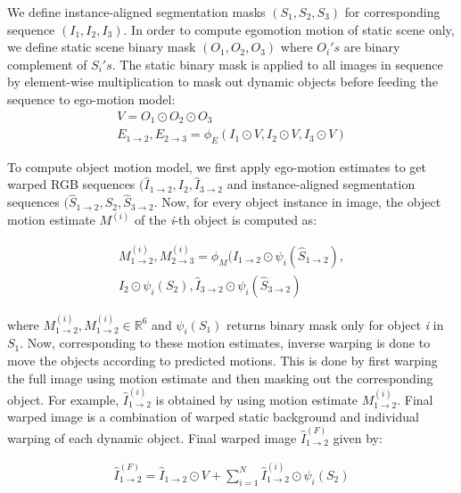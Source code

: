 \documentclass[10pt,twocolumn,letterpaper]{article}
\begin{document}
We define instance-aligned segmentation masks $(S_{1}, S_{2}, S_{3})$ for corresponding sequence $(I_{1}, I_{2}, I_{3})$. In order to compute egomotion motion of static scene only, we define static scene binary mask $(O_{1}, O_{2}, O_{3})$ where $O_{i}'s$ are binary complement of $S_{i}'s$. The static binary mask is applied to all images in sequence by element-wise multiplication to mask out dynamic objects before feeding the sequence to ego-motion model:
\begin{multline}
    V = O_{1} \odot O_{2} \odot O_{3} 
    \\
E_{1\rightarrow2}, E_{2\rightarrow3} = \phi_{E}(I_{1} \odot V, I_{2} \odot V, I_{3} \odot V) 
\end{multline}

To compute object motion model, we first apply ego-motion estimates to get warped RGB sequences $(\hat I_{1\rightarrow2}, I_{2}, \hat I_{3\rightarrow2}$ and instance-aligned segmentation sequences $(\hat S_{1\rightarrow2}, S_{2}, \hat S_{3\rightarrow2}$. Now, for every object instance in image, the object motion estimate $M^{(i)}$ of the \textit{i}-th object is computed as:

\begin{multline}
        M_{1\rightarrow2}^{(i)}, M_{2\rightarrow3}^{(i)} = \phi_{M}(\hat I_{1\rightarrow2} \odot \psi_{i}(\hat S_{1\rightarrow2}),
    \\
    I_{2} \odot \psi_{i}(S_{2}), \hat I_{3\rightarrow2} \odot \psi_{i}(\hat S_{3\rightarrow2})
\end{multline}

where $M_{1\rightarrow2}^{(i)}, M_{1\rightarrow2}^{(i)} \in \mathbb{R}^{6}$ and $\psi_{i}(S_{1})$ returns binary mask only for object \textit{i} in  $S_{1}$. Now, corresponding to these motion estimates, inverse warping is done to move the objects according to predicted motions. This is done by first warping the full image using motion estimate and then masking out the corresponding object. For example, $\hat I_{1\rightarrow2}^{(i)}$ is obtained by using motion estimate $M_{1\rightarrow2}^{(i)}$. Final warped image is a combination of warped static background and individual warping of each dynamic object. Final warped image $\hat I_{1\rightarrow2}^{(F)}$ given by:

\begin{multline}
\hat I_{1\rightarrow2}^{(F)} = \hat I_{1\rightarrow2} \odot V + \sum_{i=1}^{N} \hat I_{1\rightarrow2}^{(i)} \odot \psi_{i}(S_{2})
\end{multline}
\end{document}
